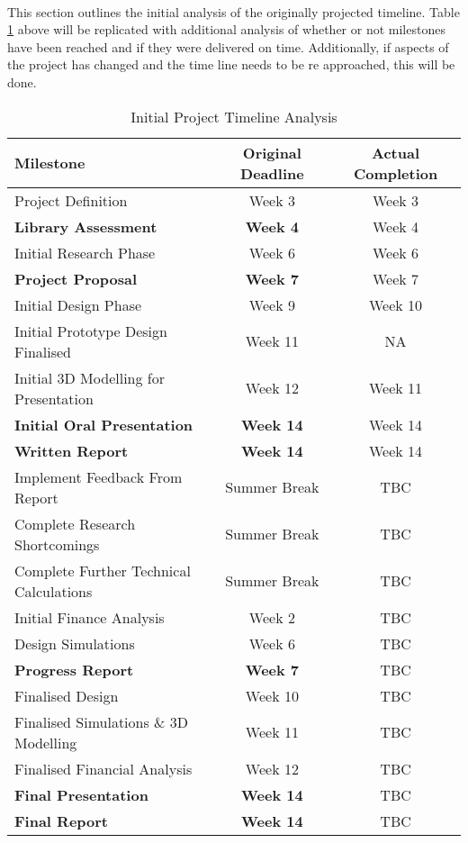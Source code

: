 \paragraph{}
This section outlines the initial analysis of the originally projected timeline. Table \ref{table:milestones_2} above will be replicated with additional analysis of whether or not milestones have been reached and if they were delivered on time. Additionally, if aspects of the project has changed and the time line needs to be re approached, this will be done.  

\begin{table}[H]
\centering
\begin{tabular}{||p{5cm} c c||} 
 \hline
 \textbf{Milestone} & \textbf{Original Deadline} & \textbf{Actual Completion} \\ [0.5ex] 
 \hline\hline
 Project Definition 						& Week 3 & Week 3\\ 
 \textbf{Library Assessment} 				& \textbf{Week 4} & Week 4\\
 Initial Research Phase 					& Week 6 & Week 6\\
 \textbf{Project Proposal} 					& \textbf{Week 7} & Week 7\\
 Initial Design Phase & Week 9				& Week 10\\
 Initial Prototype Design Finalised 		& Week 11 & NA\\
 Initial 3D Modelling for Presentation 		& Week 12 & Week 11\\ 
 \textbf{Initial Oral Presentation} 		& \textbf{Week 14} & Week 14\\
 \textbf{Written Report} 					& \textbf{Week 14} & Week 14\\ 
 Implement Feedback From Report 			& Summer Break & TBC \\
 Complete Research Shortcomings 			& Summer Break & TBC \\
 Complete Further Technical Calculations 	& Summer Break & TBC \\
 Initial Finance Analysis 					& Week 2 & TBC \\
 Design Simulations 						& Week 6 & TBC \\ 
 \textbf{Progress Report} 					& \textbf{Week 7} & TBC \\
 Finalised Design 							& Week 10 & TBC \\
 Finalised Simulations \& 3D Modelling 		& Week 11 & TBC \\
 Finalised Financial Analysis 				& Week 12 & TBC \\ 
 \textbf{Final Presentation} 				& \textbf{Week 14} & TBC\\
 \textbf{Final Report} 						& \textbf{Week 14} & TBC\\ [1ex] 
 \hline
\end{tabular}
\caption{Initial Project Timeline Analysis}
\label{table:milestones_2}
\end{table}      

